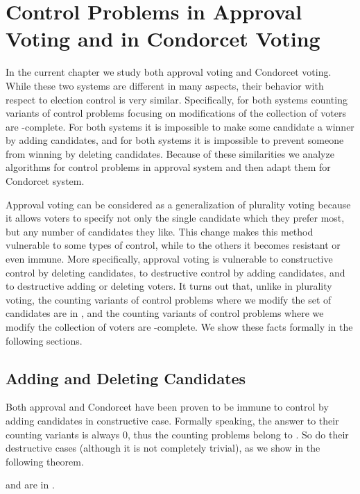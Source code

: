 \chapter{Control Problems in Approval Voting and in Condorcet Voting} \label{ch:approval_condorcet}

In the current chapter we study both approval voting and Condorcet voting.
While these two systems are different in many aspects, their behavior with respect to election control is very similar.
Specifically, for both systems counting variants of control problems focusing on modifications of the collection of voters are \sharpPclass-complete.
For both systems it is impossible to make some candidate a winner by adding candidates, and for both systems it is impossible to prevent someone from winning by deleting candidates.
Because of these similarities we analyze algorithms for control problems in approval system and then adapt them for Condorcet system.

Approval voting can be considered as a generalization of plurality voting because it allows voters to specify not only the single candidate which they prefer most, but any number of candidates they like.
This change makes this method vulnerable to some types of control, while to the others it becomes resistant or even immune.
More specifically, approval voting is vulnerable to constructive control by deleting candidates, to destructive control by adding candidates, and to destructive adding or deleting voters.
It turns out that, unlike in plurality voting, the counting variants of control problems where we modify the set of candidates are in \FPclass, and the counting variants of control problems where we modify the collection of voters are \sharpPclass-complete.
We show these facts formally in the following sections.

\section{Adding and Deleting Candidates} \label{sec:accan}

Both approval and Condorcet have been proven to be immune to control by adding candidates in constructive case.
Formally speaking, the answer to their counting variants is always 0, thus the counting problems belong to \FPclass.
So do their destructive cases (although it is not completely trivial), as we show in the following theorem.

\begin{theorem} \label{th:acacd}
	 and  are in \FPclass.
\end{theorem}

